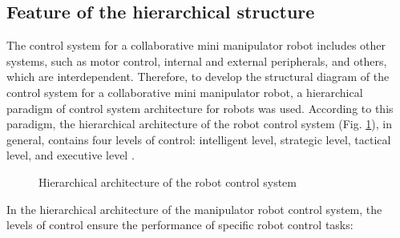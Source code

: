 \subsection{Feature of the hierarchical structure}
The control system for a collaborative mini manipulator robot includes other systems, such as motor control, internal and external peripherals, and others, which are interdependent. Therefore, to develop the structural diagram of the control system for a collaborative mini manipulator robot, a hierarchical paradigm of control system architecture for robots was used. According to this paradigm, the hierarchical architecture of the robot control system (Fig. \ref{Hierar}), in general, contains four levels of control: intelligent level, strategic level, tactical level, and executive level \citep{Khatib1997}.

\begin{figure}[H]
	\centering
	
	\caption{Hierarchical architecture of the robot control system}
	\label{Hierar}
\end{figure}

In the hierarchical architecture of the manipulator robot control system, the levels of control ensure the performance of specific robot control tasks:

